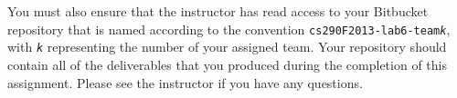 You must also ensure that the instructor has read access to your Bitbucket repository that is named according to the
convention {\tt cs290F2013-lab6-team{\em k}}, with {\tt {\em k}} representing the number of your assigned team.  Your
repository should contain all of the deliverables that you produced during the completion of this assignment.  Please
see the instructor if you have any questions.


